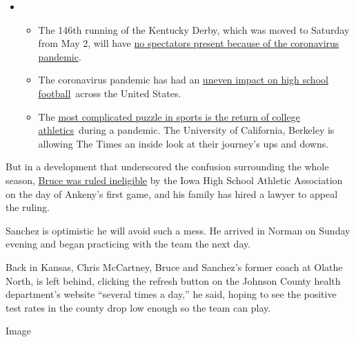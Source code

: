 \begin{itemize}
\item
  \begin{itemize}
  \tightlist
  \item
    The 146th running of the Kentucky Derby, which was moved to Saturday
    from May 2, will have
    \href{https://www.nytimes3xbfgragh.onion/2020/09/04/sports/horse-racing/kentucky-derby-odds-picks.html?action=click\&pgtype=Article\&state=default\&region=MAIN_CONTENT_2\&context=storylines_keepup}{no
    spectators present because of the coronavirus pandemic}.
  \item
    The coronavirus pandemic has had an
    \href{https://www.nytimes3xbfgragh.onion/2020/09/03/sports/ncaafootball/high-school-football-coronavirus-pandemic.html?action=click\&pgtype=Article\&state=default\&region=MAIN_CONTENT_2\&context=storylines_keepup}{uneven
    impact on high school football}~across the United States.
  \item
    The
    \href{https://www.nytimes3xbfgragh.onion/2020/09/02/sports/ncaafootball/coronavirus-cal-athletics-season.html?action=click\&pgtype=Article\&state=default\&region=MAIN_CONTENT_2\&context=storylines_keepup}{most
    complicated puzzle in sports is the return of college
    athletics}~during a pandemic. The University of California, Berkeley
    is allowing The Times an inside look at their journey's ups and
    downs.
  \end{itemize}
\end{itemize}

But in a development that underscored the confusion surrounding the
whole season,
\href{https://www.hawkcentral.com/story/sports/high-school/2020/09/03/iowa-hawkeyes-recruit-arland-bruce-iv-appeal-court-recommends-ihsaa-rule-him-eligible-iahsfb/3452537001/}{Bruce
was ruled ineligible} by the Iowa High School Athletic Association on
the day of Ankeny's first game, and his family has hired a lawyer to
appeal the ruling.

Sanchez is optimistic he will avoid such a mess. He arrived in Norman on
Sunday evening and began practicing with the team the next day.

Back in Kansas, Chris McCartney, Bruce and Sanchez's former coach at
Olathe North, is left behind, clicking the refresh button on the Johnson
County health department's website ``several times a day,'' he said,
hoping to see the positive test rates in the county drop low enough so
the team can play.

Image

